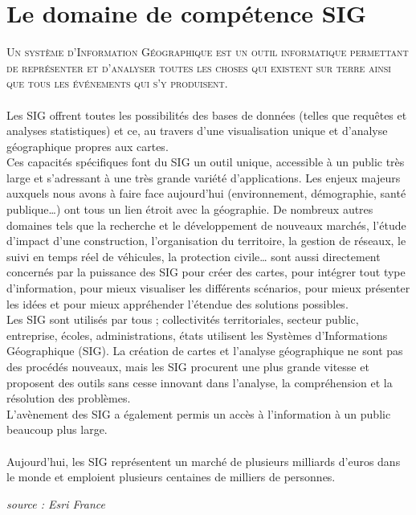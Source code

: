 \section{Le domaine de compétence SIG}
\textsc{
Un système d’Information Géographique est un outil informatique permettant de représenter et d’analyser toutes les choses qui existent sur terre ainsi que tous les événements qui s’y produisent.
}\\\\
Les SIG offrent toutes les possibilités des bases de données (telles que requêtes et analyses statistiques) et ce, au travers d’une visualisation unique et d’analyse géographique propres aux cartes.
\\Ces capacités spécifiques font du SIG un outil unique, accessible à un public très large et s’adressant à une très grande variété d’applications.
Les enjeux majeurs auxquels nous avons à faire face aujourd’hui (environnement, démographie, santé publique…) ont tous un lien étroit avec la géographie.
De nombreux autres domaines tels que la recherche et le développement de nouveaux marchés, l’étude d’impact d’une construction, l’organisation du territoire, la gestion de réseaux, le suivi en temps réel de véhicules, la protection civile… sont aussi directement concernés par la puissance des SIG pour créer des cartes, pour intégrer tout type d’information, pour mieux visualiser les différents scénarios, pour mieux présenter les idées et pour mieux appréhender l’étendue des solutions possibles.
\\Les SIG sont utilisés par tous ; collectivités territoriales, secteur public, entreprise, écoles, administrations, états utilisent les Systèmes d’Informations Géographique (SIG). La création de cartes et l’analyse géographique ne sont pas des procédés nouveaux, mais les SIG procurent une plus grande vitesse et proposent des outils sans cesse innovant dans l’analyse, la compréhension et la résolution des problèmes.
\\L’avènement des SIG a également permis un accès à l’information à un public beaucoup plus large.
\\\\
Aujourd’hui, les SIG représentent un marché de plusieurs milliards d'euros dans le monde et emploient plusieurs centaines de milliers de personnes.
\begin{flushright}
\textit{source : Esri France}
\end{flushright}
